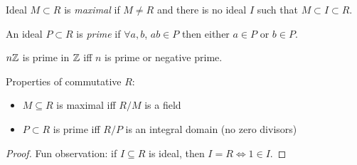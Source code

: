 \documentclass[a4paper,twoside,master.tex]{subfiles}
\begin{document}
\begin{definition}
    Ideal $ M \subset R $ is \textit{maximal} if $ M \neq R $ and there is no ideal $ I $ such that $ M \subset I \subset R $.
\end{definition}

\begin{definition}
    An ideal $ P \subset R $ is \textit{prime} if $ \forall a, b $, $ a b \in P $ then either $ a \in P $ or $ b \in P $. 
\end{definition}

\begin{ex}
    $ n\mathbb{Z} $ is prime in $ \mathbb{Z} $ iff $ n $ is prime or negative prime.
\end{ex}

Properties of commutative $ R $:
\begin{itemize}
    \item $ M \subseteq R $ is maximal iff $ R/M $ is a field
    \item $ P \subset R $ is prime iff $ R/P $ is an integral domain (no zero divisors)
\end{itemize}
\begin{proof}
    Fun observation: if $ I \subseteq R $ is ideal, then $ I = R \iff 1 \in I $.
\end{proof}
\end{document}
